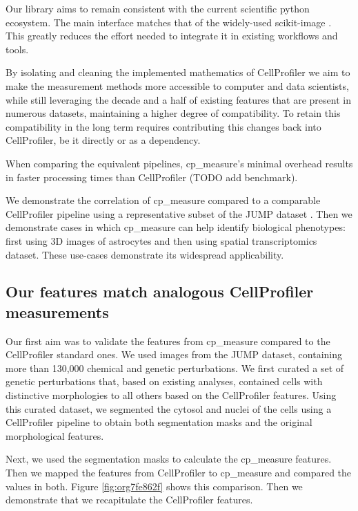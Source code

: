 \documentclass{article}
\begin{document}
Our library aims to remain consistent with the current scientific python ecosystem. The main interface matches that of the widely-used scikit-image \citep{waltScikitimageImageProcessing2014}. This greatly reduces the effort needed to integrate it in existing workflows and tools.

By isolating and cleaning the implemented mathematics of CellProfiler we aim to make the measurement methods more accessible to computer and data scientists, while still leveraging the decade and a half of existing features that are present in numerous datasets, maintaining a higher degree of compatibility. To retain this compatibility in the long term requires contributing this changes back into CellProfiler, be it directly or as a dependency.

When comparing the equivalent pipelines, cp\_measure's minimal overhead results in faster processing times than CellProfiler (TODO add benchmark).

We demonstrate the correlation of cp\_measure compared to a comparable CellProfiler pipeline using a representative subset of the JUMP dataset \citep{chandrasekaranJUMPCellPainting2023}. Then we demonstrate cases in which cp\_measure can help identify biological phenotypes: first using 3D images of astrocytes and then using spatial transcriptomics dataset. These use-cases demonstrate its widespread applicability. 
\subsection{Our features match analogous CellProfiler measurements}
\label{sec:org37e389d}

Our first aim was to validate the features from cp\_measure compared to the CellProfiler standard ones. We used images from the JUMP dataset, containing more than 130,000 chemical and genetic perturbations. We first curated a set of genetic perturbations that, based on existing analyses, contained cells with distinctive morphologies to all others based on the CellProfiler features. Using this curated dataset, we segmented the cytosol and nuclei of the cells using a CellProfiler pipeline to obtain both segmentation masks and the original morphological features.

Next, we used the segmentation masks to calculate the cp\_measure features. Then we mapped the features from CellProfiler to cp\_measure and compared the values in both. Figure \ref{fig:org7fe862f} shows this comparison. Then we demonstrate that we recapitulate the CellProfiler features.
\end{document}
